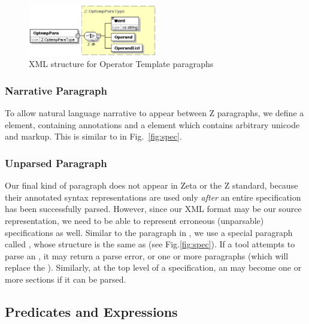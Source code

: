 \documentclass{llncs}  %
\newcommand{\Zeta}{Zeta}
\begin{document}
\begin{figure}[htbp]
  \centering
  \includegraphics[width=0.5\textwidth]{optemppara.eps}
  \caption{XML structure for Operator Template paragraphs}
  \label{fig:optemppara}
\end{figure}


\subsubsection{Narrative Paragraph}

To allow natural language narrative to appear between Z paragraphs,
we define a  element, containing annotations
and a  element which contains arbitrary unicode and
markup.  This is similar to  in Fig.~\ref{fig:spec}.

\subsubsection{Unparsed Paragraph}

Our final kind of paragraph does not appear in {\Zeta}
or the Z standard, because their annotated syntax representations
are used only \emph{after} an entire specification has been successfully
parsed.  However, since our XML format may be our source representation,
we need to be able to represent erroneous (unparsable) specifications as
well.  Similar to the  paragraph in \CADiZ, we use a
special paragraph called , whose structure is the
same as  (see Fig.\ref{fig:spec}).
If a tool attempts to parse an , it may return a parse
error, or one or more paragraphs (which will replace the
).  Similarly, at the top level of a specification, an
 may become one or more sections if it can be parsed.



\subsection{Predicates and Expressions} \label{sec:expr}
\end{document}
